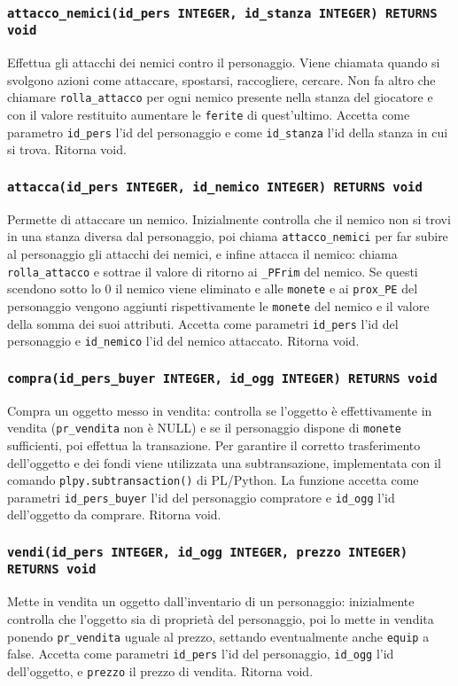 \documentclass[10pt,a4paper]{article}
\begin{document}
\subsubsection{\texttt{attacco\_nemici(id\_pers INTEGER, id\_stanza INTEGER) RETURNS void}}
Effettua gli attacchi dei nemici contro il personaggio. Viene chiamata quando si svolgono azioni come attaccare, spostarsi, raccogliere, cercare. Non fa altro che chiamare \texttt{rolla\_attacco} per ogni nemico presente nella stanza del giocatore e con il valore restituito aumentare le \texttt{ferite} di quest'ultimo. Accetta come parametro \texttt{id\_pers} l'id del personaggio e come \texttt{id\_stanza} l'id della stanza in cui si trova. Ritorna void.

\subsubsection{\texttt{attacca(id\_pers INTEGER, id\_nemico INTEGER) RETURNS void}}
Permette di attaccare un nemico. Inizialmente controlla che il nemico non si trovi in una stanza diversa dal personaggio, poi chiama \texttt{attacco\_nemici} per far subire al personaggio gli attacchi dei nemici, e infine attacca il nemico: chiama \texttt{rolla\_attacco} e sottrae il valore di ritorno ai \texttt{\_PFrim} del nemico. Se questi scendono sotto lo 0 il nemico viene eliminato e alle \texttt{monete} e ai \texttt{prox\_PE} del personaggio vengono aggiunti rispettivamente le \texttt{monete} del nemico e il valore della somma dei suoi attributi. Accetta come parametri \texttt{id\_pers} l'id del personaggio e \texttt{id\_nemico} l'id del nemico attaccato. Ritorna void.

\subsubsection{\texttt{compra(id\_pers\_buyer INTEGER, id\_ogg INTEGER) RETURNS void}}
Compra un oggetto messo in vendita: controlla se l'oggetto è effettivamente in vendita (\texttt{pr\_vendita} non è NULL) e se il personaggio dispone di \texttt{monete} sufficienti, poi effettua la transazione. Per garantire il corretto trasferimento dell'oggetto e dei fondi viene utilizzata una subtransazione, implementata con il comando \texttt{plpy.subtransaction()} di PL/Python. La funzione accetta come parametri \texttt{id\_pers\_buyer} l'id del personaggio compratore e \texttt{id\_ogg} l'id dell'oggetto da comprare. Ritorna void.

\subsubsection{\texttt{vendi(id\_pers INTEGER, id\_ogg INTEGER, prezzo INTEGER) RETURNS void}}
Mette in vendita un oggetto dall'inventario di un personaggio: inizialmente controlla che l'oggetto sia di proprietà del personaggio, poi lo mette in vendita ponendo \texttt{pr\_vendita} uguale al prezzo, settando eventualmente anche \texttt{equip} a false. Accetta come parametri \texttt{id\_pers} l'id del personaggio, \texttt{id\_ogg} l'id dell'oggetto, e \texttt{prezzo} il prezzo di vendita. Ritorna void.
\end{document}
